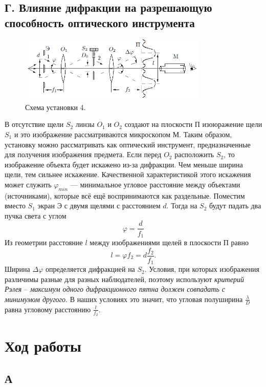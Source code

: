 \documentclass[a4paper, 12pt]{article}%
\begin{document}
	\subsection*{Г. Влияние дифракции на разрешающую способность оптического инструмента}
	\begin{figure}[h]
		\includegraphics[width = 0.8\textwidth]{images/431-6.png}
		\centering
		\caption{Схема установки 4.}
	\end{figure}
	В отсутствие щели $S_2$ линзы $O_1$ и $O_2$ создают на плоскости П изоюражение щели $S_1$ и это изображение рассматриваются микроскопом М. Таким образом, установку можно рассматривать как оптический инструмент, предназначенные для получения изображения предмета. Если перед $O_2$ расположить $S_2$, то изображение объекта будет искажено из-за дифракции. Чем меньше ширина щели, тем сильнее искажение. Качественной характеристикой этого искажения может служить $\varphi_{min}$ --- минимальное угловое расстояние между объектами (источниками), которые всё ещё воспринимаются как раздельные. Поместим вместо $S_1$ экран Э с двумя щелями с расстоянием $d$. Тогда на $S_2$ будут падать два пучка света с углом
	\begin{equation}
	\varphi = \dfrac{d}{f_1}
	\end{equation}
	Из геометрии расстояние $l$ между изображениями щелей в плоскости П равно 
	\begin{equation}
	l = \varphi f_2 = d \dfrac{f_2}{f_1}.
	\end{equation}
	Ширина $\Delta \varphi$ определяется дифракцией на $S_2$. Условия, при которых изображения различимы разные для разных наблюдателей, поэтому используют \textit{критерий Рэлея} -- \textit{максимум одного дифракционного пятна должен совпадать с минимумом другого}. В наших условиях это значит, что угловая полуширина $\frac{\lambda}{D}$ равна угловому расстоянию $\frac{l}{f_2}$.
	
\section*{Ход работы}

\subsection*{А}
\end{document}
